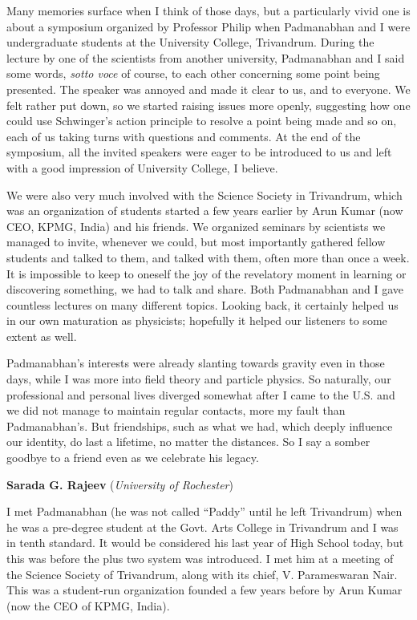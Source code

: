 \documentclass[prd, preprint, longbibliography, 12pt]{revtex4-2}
\begin{document}
Many memories surface when I think of those days, but a particularly vivid one is about a symposium organized by Professor Philip when Padmanabhan and I were undergraduate students at the University College, Trivandrum. During the lecture by one of the scientists from another university, Padmanabhan and I said some words, {\it sotto voce} of course, to each other concerning some point being presented. The speaker was annoyed and made it clear to us, and to everyone. We felt rather put down, so we started raising issues more openly, suggesting how one could use Schwinger’s action principle to resolve a point being made and so on, each of us taking turns with questions and comments. At the end of the symposium, all the invited speakers were eager to be introduced to us and left with a good impression of University College, I believe.

We were also very much involved with the Science Society in Trivandrum, which was an organization of students started a few years earlier by Arun Kumar (now CEO, KPMG, India) 
and his friends. We organized seminars by scientists we managed to invite, whenever we could, but most importantly gathered fellow students and talked to them, and talked with them, often more than once a week. It is impossible to keep to oneself the joy of the revelatory moment in learning or discovering something, we had to talk and share. Both Padmanabhan and I gave countless lectures on many different topics. Looking back, it certainly helped us in our own maturation as physicists; hopefully it helped our listeners to some extent as well. 

Padmanabhan’s interests were already slanting towards gravity even in those days, while I was more into field theory and particle physics. So naturally, our professional and personal lives diverged somewhat after I came to the U.S. and we did not manage to maintain regular contacts, more my fault than Padmanabhan’s. But friendships, such as what we had, which deeply influence our identity, do last a lifetime, no matter the distances. So I say a somber goodbye to a friend even as we celebrate his legacy.

\newpage

\centerline{{\bf Sarada  G. Rajeev} ({\it University of Rochester}) }
\medskip
{}

\noindent I met Padmanabhan (he was not called “Paddy” until he left Trivandrum) when he was a pre-degree student at the Govt. Arts College in Trivandrum and I was in tenth standard. It would be considered his last year of High School today, but this was before the plus two system was introduced. I met him at a meeting of the Science Society of Trivandrum, along with its chief, V. Parameswaran Nair. This was a student-run organization founded a few years before by Arun Kumar (now the CEO of KPMG, India).
\end{document}
